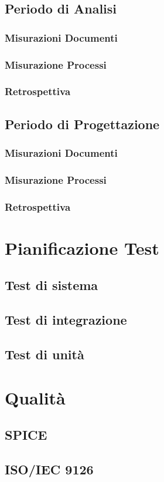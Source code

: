 \documentclass[a4paper, oneside, openany, dvipsnames, table]{article}
\begin{document}
	\label{app:misure}
	\subsection{Periodo di Analisi}
		\subsubsection{Misurazioni Documenti}
			
		\subsubsection{Misurazione Processi}
			
		\subsubsection{Retrospettiva}
			
		
\newpage	
	\subsection{Periodo di Progettazione}
		\subsubsection{Misurazioni Documenti}
			
		\subsubsection{Misurazione Processi}
			
		\subsubsection{Retrospettiva}
			
\newpage
\section{Pianificazione Test}
\subsection{Test di sistema}
	
\subsection{Test di integrazione}
	
\subsection{Test di unità}
	
	
\newpage
\section{Qualità}
	\subsection{SPICE}
		\label{app:SPICE}
		
	\subsection{ISO/IEC 9126}
		\label{app:ISO/IEC 9126}
		
\end{document}
